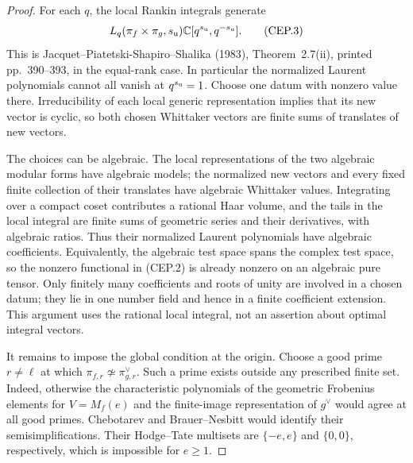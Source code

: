 \begin{proof}
For each $q$, the local Rankin integrals generate
\[
 L_q(\pi_f\times\pi_g,s_{\rm u})
             \mathbb C[q^{s_{\rm u}},q^{-s_{\rm u}}].
                                                        \tag{CEP.3}
\]
This is Jacquet--Piatetski-Shapiro--Shalika (1983),
Theorem~2.7(ii), printed pp.~390--393, in the equal-rank
case.  In particular the normalized Laurent polynomials
cannot all vanish at $q^{s_{\rm u}}=1$.  Choose one datum
with nonzero value there.  Irreducibility of each local
generic representation implies that its new vector is
cyclic, so both chosen Whittaker vectors are finite sums
of translates of new vectors.

The choices can be algebraic.  The local representations of
the two algebraic modular forms have algebraic models; the
normalized new vectors and every fixed finite collection of
their translates have algebraic Whittaker values.  Integrating
over a compact coset contributes a rational Haar volume, and
the tails in the local integral are finite sums of
geometric series and their derivatives, with algebraic
ratios.  Thus their normalized Laurent
polynomials have algebraic coefficients.  Equivalently, the
algebraic test space spans the complex test space, so the
nonzero functional in (CEP.2) is already nonzero on an
algebraic pure tensor.  Only finitely many coefficients and
roots of unity are involved in a chosen datum; they lie in
one number field and hence in a finite coefficient extension.
This argument uses the rational local integral, not an
assertion about optimal integral vectors.

It remains to impose the global condition at the origin.
Choose a good prime $r\ne\ell$ at which
$\pi_{f,r}\not\simeq\pi_{g,r}^{\vee}$.
Such a prime exists outside any prescribed finite set.
Indeed, otherwise the characteristic polynomials of the
geometric Frobenius elements for
$V=M_f(e)$ and the finite-image representation of
$g^\vee$ would agree at all good primes.
Chebotarev and Brauer--Nesbitt would identify their
semisimplifications.  Their Hodge--Tate multisets are
$\{-e,e\}$ and $\{0,0\}$, respectively, which is
impossible for $e\ge1$.


\end{proof}
